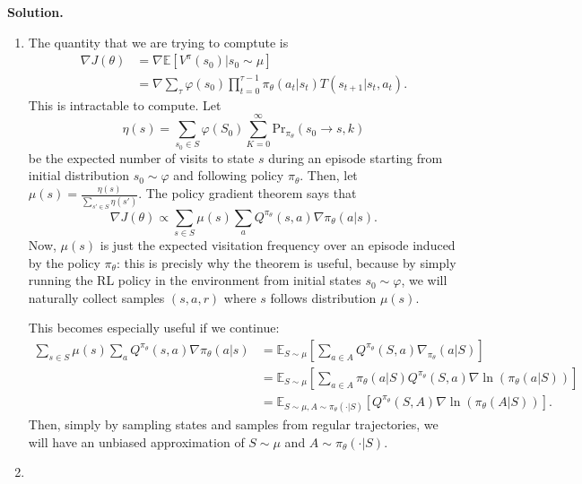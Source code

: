 \documentclass[11pt]{article}
\begin{document}
\textbf{Solution.}
\begin{enumerate}
    \item[(a)] The quantity that we are trying to comptute is
        \begin{align*}
            \nabla J(\theta) &= \nabla \mathbb{E} \left[ V^{\pi}(s_0) | s_0 \sim \mu \right] \\
            &= \nabla \sum_{\tau} \varphi(s_0) \prod_{t=0}^{\tau - 1} \pi_{\theta}(a_t | s_t) T(s_{t+1} | s_t, a_t)
        .\end{align*}
        This is intractable to compute.
        Let
        \[
            \eta (s) = \sum_{s_0 \in S} \varphi(S_0) \sum_{K = 0}^{\infty} \text{Pr}_{\pi_{\theta}}(s_0 \to s, k)
        \] 
        be the expected number of visits to state $s$ during an episode starting from initial distribution $s_0 \sim \varphi$ and following policy $\pi_{\theta}$.
        Then, let $\mu(s) = \frac{\eta(s)}{\sum_{s' \in S} \eta(s')}$.
        The policy gradient theorem says that
        \[
        \nabla J(\theta) \propto \sum_{s \in S} \mu(s) \sum_{a} Q^{\pi_{\theta}} (s, a) \nabla \pi_{\theta} (a | s)
        .\] 
        Now, $\mu(s)$ is just the expected visitation frequency over an episode induced by the policy $\pi_{\theta}$: this is precisly why the theorem is useful, because by simply running the RL policy in the environment from initial states $s_0 \sim  \varphi$, we will naturally collect samples $(s, a, r)$ where $s$ follows distribution $\mu(s)$.

        This becomes especially useful if we continue:
        \begin{align*}
            \sum_{s \in S} \mu(s) \sum_{a} Q^{\pi_{\theta}} (s, a) \nabla \pi_{\theta} (a | s) &= \mathbb{E}_{S \sim \mu} \left[ \sum_{a \in A} Q^{\pi_{\theta}}(S, a) \nabla_{\pi_{\theta}} (a | S) \right] \\
            &= \mathbb{E}_{S \sim \mu} \left[ \sum_{a \in A} \pi_{\theta} (a | S) Q^{\pi_{\theta}}(S, a) \nabla \ln( \pi_{\theta} (a | S)) \right]  \\
            &= \mathbb{E}_{S \sim \mu, A \sim \pi_{\theta}( \cdot | S)} \left[ Q^{\pi_{\theta}} (S, A) \nabla \ln(\pi_{\theta}(A | S)) \right]
        .\end{align*}
        Then, simply by sampling states and samples from regular trajectories, we will have an unbiased approximation of $S \sim \mu$ and $A \sim  \pi_{\theta}(\cdot | S)$.

    \item[(b)]


\end{enumerate}
\end{document}
